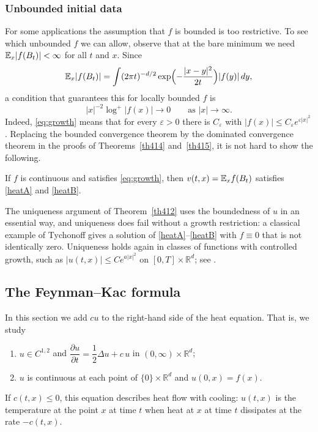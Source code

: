 \subsubsection{Unbounded initial data}
For some applications the assumption that $f$ is bounded is too restrictive.
To see which unbounded $f$ we can allow, observe that at the bare minimum we
need $\mathbb{E}_x|f(B_t)|<\infty$ for all $t$ and $x$. Since
\[
	\mathbb{E}_x|f(B_t)| = \int(2\pi t)^{-d/2}\exp\Bigl(-\frac{|x-y|^2}{2t}\Bigr)|f(y)|\,dy,
\]
a condition that guarantees this for locally bounded $f$ is
\begin{equation}\label{eq:growth}
	|x|^{-2}\log^+|f(x)|\longrightarrow 0 \qquad\text{as } |x|\to\infty .
\end{equation}
Indeed, \eqref{eq:growth} means that for every $\varepsilon>0$ there is
$C_\varepsilon$ with $|f(x)|\leqslant C_\varepsilon e^{\varepsilon|x|^2}$.
Replacing the bounded convergence theorem by the dominated convergence theorem
in the proofs of Theorems~\ref{th414} and~\ref{th415}, it is not hard to show
the following.

\begin{theorem}\label{th:heat-unbounded}
	If $f$ is continuous and satisfies \eqref{eq:growth}, then
	$v(t,x) = \mathbb{E}_x f(B_t)$ satisfies \ref{heatA} and \ref{heatB}.
\end{theorem}

\begin{remark}
	The uniqueness argument of Theorem~\ref{th412} uses the boundedness of $u$
	in an essential way, and uniqueness does fail without a growth restriction:
	a classical example of Tychonoff gives a solution of
	\ref{heatA}--\ref{heatB} with $f\equiv0$ that is not identically zero.
	Uniqueness holds again in classes of functions with controlled growth, such
	as $|u(t,x)|\leqslant Ce^{a|x|^2}$ on $[0,T]\times\mathbb{R}^d$; see
	\citet{Friedman1964}.
\end{remark}

\subsection{The Feynman--Kac formula}

In this section we add $cu$ to the right-hand side of the heat equation. That
is, we study
\begin{enumerate}[label=(\Alph*)]
	\item\label{fkA} $u\in C^{1,2}$ and $\dfrac{\partial u}{\partial t} = \dfrac{1}{2}\Delta u + c\,u$ in $(0,\infty)\times\mathbb{R}^d$;
	\item\label{fkB} $u$ is continuous at each point of $\{0\}\times\mathbb{R}^d$ and $u(0,x) = f(x)$.
\end{enumerate}
If $c(t,x)\leqslant0$, this equation describes heat flow with cooling: $u(t,x)$
is the temperature at the point $x$ at time $t$ when heat at $x$ at time $t$
dissipates at the rate $-c(t,x)$.

